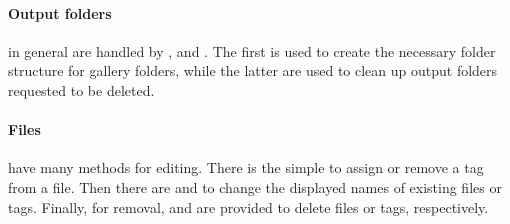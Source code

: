 \paragraph{Output folders}

in general are handled by ,  and
. The first is used to create the necessary folder
structure for gallery folders, while the latter are used to clean up output
folders requested to be deleted.

\paragraph{Files}

have many methods for editing. There is the simple
 to assign or remove a tag from a file. Then there are
 and  to change the displayed names of
existing files or tags. Finally, for removal,  and
 are provided to delete files or tags, respectively.
